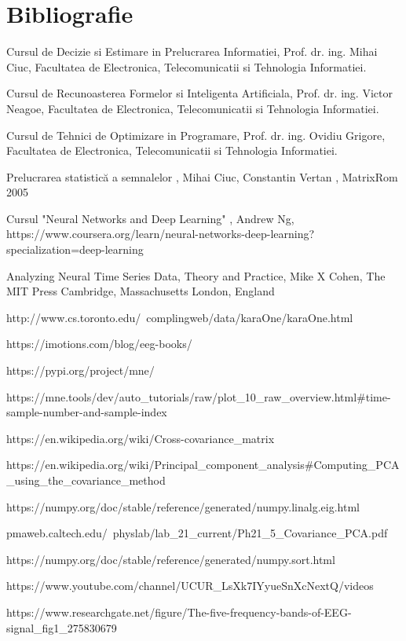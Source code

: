 \section{Bibliografie}

\begin{thebibliography}{100} %
	 Cursul de Decizie si Estimare in Prelucrarea Informatiei, 
	Prof. dr. ing. Mihai Ciuc, 
	Facultatea de Electronica, Telecomunicatii si Tehnologia Informatiei.
	
	 Cursul de Recunoasterea Formelor si Inteligenta Artificiala, 
	Prof. dr. ing. Victor Neagoe, 
	Facultatea de Electronica, Telecomunicatii si Tehnologia Informatiei.
	
	
	 Cursul de Tehnici de Optimizare in Programare, 
	Prof. dr. ing. Ovidiu Grigore, 
	Facultatea de Electronica, Telecomunicatii si Tehnologia Informatiei.
	
	 Prelucrarea statistică a semnalelor , Mihai Ciuc, Constantin Vertan , MatrixRom 2005
	
	 Cursul "Neural Networks and Deep Learning" , Andrew Ng, \\
	https://www.coursera.org/learn/neural-networks-deep-learning?specialization=deep-learning 
	
	 Analyzing Neural Time Series Data,
	Theory and Practice, Mike X Cohen, The MIT Press
	Cambridge, Massachusetts
	London, England
	
	 http://www.cs.toronto.edu/~complingweb/data/karaOne/karaOne.html
	
	\bibitem{} https://imotions.com/blog/eeg-books/
	
	\bibitem{} https://pypi.org/project/mne/
	
	\bibitem{} https://mne.tools/dev/auto\_tutorials/raw/plot\_10\_raw\_overview.html\#time-sample-number-and-sample-index
	
	\bibitem{} https://en.wikipedia.org/wiki/Cross-covariance\_matrix
	
	
	\bibitem{} https://en.wikipedia.org/wiki/Principal\_component\_analysis\#Computing\_PCA\_using\_the\_covariance\_method
	
	\bibitem{} https://numpy.org/doc/stable/reference/generated/numpy.linalg.eig.html
	
	\bibitem{}  pmaweb.caltech.edu/~physlab/lab\_21\_current/Ph21\_5\_Covariance\_PCA.pdf
	
	\bibitem{} https://numpy.org/doc/stable/reference/generated/numpy.sort.html
	
	
	\bibitem{} https://www.youtube.com/channel/UCUR\_LsXk7IYyueSnXcNextQ/videos
	
	\bibitem{} https://www.researchgate.net/figure/The-five-frequency-bands-of-EEG-signal\_fig1\_275830679
	
\end{thebibliography}